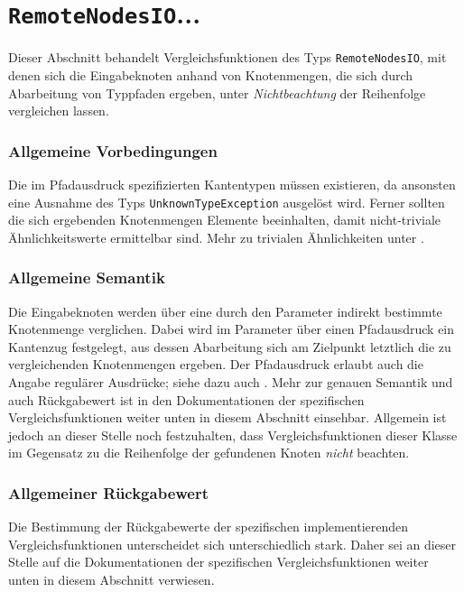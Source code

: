 %
%

\section{\texttt{RemoteNodesIO}...}
\label{strct:spec:remotenodesio}
Dieser Abschnitt behandelt Vergleichsfunktionen des Typs \texttt{RemoteNodesIO}, mit denen sich die Eingabeknoten anhand von Knotenmengen, die sich durch Abarbeitung von Typpfaden ergeben, unter \emph{Nichtbeachtung} der Reihenfolge vergleichen lassen.

\subsubsection*{Allgemeine Vorbedingungen}
Die im Pfadausdruck spezifizierten Kantentypen müssen existieren, da ansonsten eine Ausnahme des Typs \texttt{UnknownTypeException} ausgelöst wird. Ferner sollten die sich ergebenden Knotenmengen Elemente beeinhalten, damit nicht-triviale Ähnlichkeitswerte ermittelbar sind. Mehr zu trivialen Ähnlichkeiten unter .

\subsubsection*{Allgemeine Semantik}
Die Eingabeknoten werden über eine durch den Parameter indirekt bestimmte Knotenmenge verglichen. Dabei wird im Parameter über einen Pfadausdruck ein Kantenzug festgelegt, aus dessen Abarbeitung sich am Zielpunkt letztlich die zu vergleichenden Knotenmengen ergeben. Der Pfadausdruck erlaubt auch die Angabe regulärer Ausdrücke; siehe dazu auch . Mehr zur genauen Semantik und auch Rückgabewert ist in den Dokumentationen der spezifischen Vergleichsfunktionen weiter unten in diesem Abschnitt einsehbar. Allgemein ist jedoch an dieser Stelle noch festzuhalten, dass Vergleichsfunktionen dieser Klasse im Gegensatz zu  die Reihenfolge der gefundenen Knoten \emph{nicht} beachten.

\subsubsection*{Allgemeiner Rückgabewert}
Die Bestimmung der Rückgabewerte der spezifischen implementierenden Vergleichsfunktionen unterscheidet sich unterschiedlich stark. Daher sei an dieser Stelle auf die Dokumentationen der spezifischen Vergleichsfunktionen weiter unten in diesem Abschnitt verwiesen.

